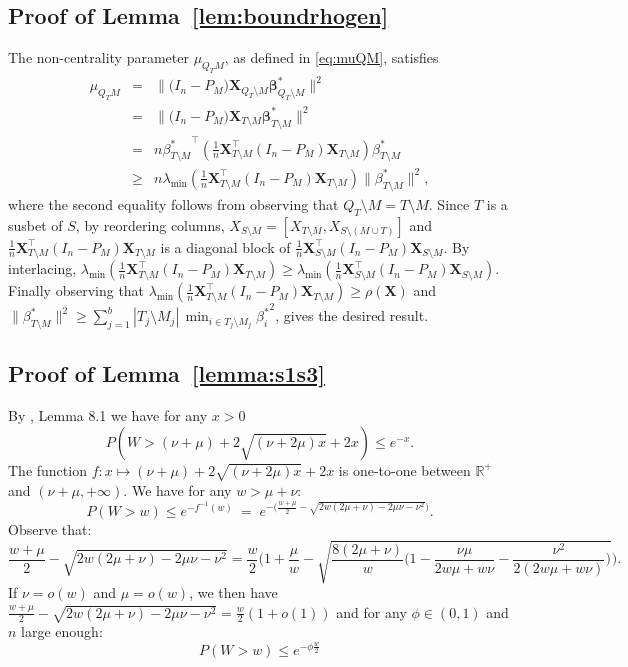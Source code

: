 \documentclass[aos]{imsart}
\theoremstyle{plain}
\newcommand{\R}{\mathbb{R}}
\newcommand{\bs}{\boldsymbol}
\begin{document}
\subsection{Proof of Lemma~\ref{lem:boundrhogen}} 
The non-centrality parameter $\mu_{Q_TM}$, as defined in \eqref{eq:muQM}, satisfies
\begin{eqnarray*}
    \mu_{Q_TM}&=&\|\big(I_n-P_M\big) \bs X_{Q_T\setminus M} \bs \beta^*_{Q_T\setminus M}\|^2\\
    &=&\|\big(I_n-P_M\big) \bs X_{T\setminus M} \bs \beta^*_{T\setminus M}\|^2\\
    &= & n {\beta^*_{T\setminus M}}^\top \left(\tfrac1n \bs X_{T\setminus M}^\top(I_n-P_M)\bs X_{T\setminus M}\right)\beta^*_{T\setminus M}\\
    &\geq & n\lambda_{\min}\left(\tfrac1n \bs X_{T\setminus M}^\top(I_n-P_M)\bs X_{T\setminus M}\right)\|\beta^*_{T\setminus M}\|^2,
\end{eqnarray*}
where the second equality follows from observing that $Q_T\setminus M=T\setminus M$. Since $T$ is a susbet of $S$, by reordering columns, $X_{S\setminus M}=[X_{T\setminus M},X_{S\setminus (M\cup T)}]$ and $\tfrac1n \bs X_{T\setminus M}^\top(I_n-P_M)\bs X_{T\setminus M}$ is a diagonal block of $\tfrac1n \bs X_{S\setminus M}^\top(I_n-P_M)\bs X_{S\setminus M}$. By interlacing, $\lambda_{\min}\left(\tfrac1n \bs X_{T\setminus M}^\top(I_n-P_M)\bs X_{T\setminus M}\right) \geq \lambda_{\min}\left(\tfrac1n \bs X_{S\setminus M}^\top(I_n-P_M)\bs X_{S\setminus M}\right)$. Finally observing that 
$\lambda_{\min}\left(\tfrac1n \bs X_{T\setminus M}^\top(I_n-P_M)\bs X_{T\setminus M}\right) \geq \rho(\bs X)$ and $\|\beta^*_{T\setminus M}\|^2\geq \sum_{j=1}^b|T_j\setminus M_j|\,\min_{i\in T_j\setminus M_j}{\beta_{i}^*}^2$, gives the desired result.

\subsection{Proof of Lemma~\ref{lemma:s1s3}}
By \cite{birge}, Lemma 8.1 we have for any $x>0$
$$P(W> (\nu+\mu)+2 \sqrt{(\nu+2 \mu) x}+2 x) \leq e^{-x}.$$
The function $f:x\mapsto (\nu+\mu)+2 \sqrt{(\nu+2 \mu) x}+2 x$ is  one-to-one between $\R^+$ and $( \nu+
\mu,+\infty)$. 
We have for any $w>\mu+\nu$:
$$P(W > w) \leq e^{-f^{-1}(w)} \:=\; e^{-\big(\frac{w+\mu}{2}  - \sqrt{2w(2 \mu+\nu)-2 \mu \nu - \nu^2 }\big) } .$$
Observe that:
$$\frac{w+\mu}{2}  - \sqrt{2w( 2 \mu+ \nu)-2 \mu \nu - \nu^2 }= \frac{w}{2}\bigg(1+\frac{\mu}{w} -\sqrt{\frac{8(2 \mu+\nu)}{w}\bigg(1-\frac{\nu\mu}{2w\mu+w\nu}-\frac{\nu^2}{2(2w\mu+w\nu)} \bigg)}\bigg).$$
 If $\nu=o(w)$ and $\mu=o(w)$, we then have $\frac{w+\mu}{2}  - \sqrt{2w( 2 \mu+ \nu)-2 \mu \nu - \nu^2 }= \frac{w}{2}(1+o(1))$ and for any $\phi\in(0,1)$ and $n$ large enough:
$$P(W > w) \leq  e^{-\phi\frac{w}{2}}$$
\end{document}
